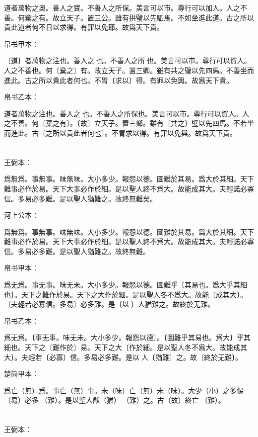\documentclass[a5paper]{ctexbook}
\begin{document}
    道者萬物之奥。善人之寶。不善人之所保。美言可以市。尊行可以加人。人之不善。何棄之有。故立天子。置三公。雖有拱璧以先駟馬。不如坐進此道。古之所以貴此道者何不日以求得。有罪以免耶。故爲天下貴。

    帛书甲本：

    〔道〕者萬物之注也。善人之󱀘也。不善人之所󱀘也。美言可以市。尊行可以賀人。人之不善也。何〔棄之〕有。故立天子。置三卿。雖有共之璧以先四馬。不善坐而進此。古之所以貴此者何也。不胃〔求以〕得。有罪以免輿。故爲天下貴。

    帛书乙本：

    道者萬物之注也。善人之󱀘也。不善人之所保也。美言可以市。尊行可以賀人。人之不善。何〔棄之有〕。〔故〕立天子。置三鄉。雖有〔共之〕璧以先四馬。不若坐而進此。古〔之所以貴此者何也〕。不胃求以得。有罪以免與。故爲天下貴。

    \chapter{}
    王弼本：

    爲無爲。事無事。味無味。大小多少。報怨以德。圖難於其易。爲大於其細。天下難事必作於易。天下大事必作於細。是以聖人終不爲大。故能成其大。夫輕諾必寡信。多易必多難。是以聖人猶難之。故終無難矣。

    河上公本：

    爲無爲。事無事。味無味。大小多少。報怨以德。圖難於其易。爲大於其細。天下難事必作於易。天下大事必作於細。是以聖人終不爲大。故能成其大。夫輕諾必寡信。多易必多難。是以聖人猶難之。故終無難。

    帛书甲本：

    爲无爲。事无事。味无未。大小多少。報怨以德。圖難乎〔其易也。爲大乎其細也〕。天下之難作於易。天下之大作於細。是以聖人冬不爲大。故能〔成其大〕。〔夫輕若必寡信。多易〕必多難。是〔以𦔻〕人猶難之。故終於无難。

    帛书乙本：

    爲无爲。〔事无事。味无未。大小多少。報怨以德〕。〔圖難乎其易也。爲大〕乎其細也。天下之〔難作於〕易。天下之大〔作於細。是以聖人冬不爲大。故能成其大〕。夫輕若〔必寡〕信。多易必多難。是以𦔻人〔猶難〕之。故〔終於无難〕。

    楚简甲本：

    爲亡（無）爲。事亡（無）事。未（味）亡（無）未（味）。大少（小）之多惕（易）必多󶴱（難）。是以聖人猷（猶）󶴱（難）之。古（故）終亡󶴱（難）。

    \chapter{}
    王弼本：
\end{document}
